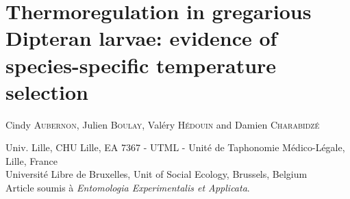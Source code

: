 
\chapter{Thermoregulation in gregarious Dipteran larvae: evidence of species-specific temperature selection}

\label{Chapter5}


Cindy \textsc{Aubernon}, Julien \textsc{Boulay}, Valéry \textsc{Hédouin} and Damien \textsc{Charabidzé}

 Univ. Lille, CHU Lille, EA 7367 - UTML - Unité de Taphonomie Médico-Légale, Lille, France\\
 Université Libre de Bruxelles, Unit of Social Ecology, Brussels, Belgium\\


Article soumis à \emph{Entomologia Experimentalis et Applicata}.

\cleardoublepage
